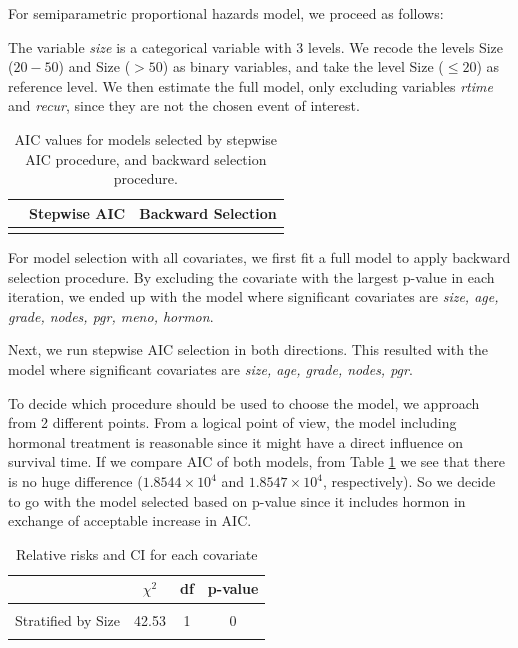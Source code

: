 \documentclass[
]{article}
\begin{document}
For semiparametric proportional hazards model, we proceed as follows:

The variable \textit{size} is a categorical variable with 3 levels. We recode the levels Size (\(20-50\)) and Size (\(>50\)) as binary variables, and take the level Size (\(\leq20\)) as reference level.
We then estimate the full model, only excluding variables \textit{rtime} and \textit{recur}, since they are not the chosen event of interest.

\begin{table}[!h]

\caption{\label{tab:AIC-table}AIC values for models selected by stepwise AIC procedure, and backward selection procedure. }
\centering
\fontsize{10}{12}\selectfont
\begin{tabular}[t]{lrr}
\toprule
  & Stepwise AIC & Backward Selection\\
\midrule
\cellcolor{gray!6}{AIC} & \cellcolor{gray!6}{18543.63} & \cellcolor{gray!6}{18546.82}\\
\bottomrule
\end{tabular}
\end{table}

For model selection with all covariates, we first fit a full model to apply backward selection procedure. By excluding the covariate with the largest p-value in each iteration, we ended up with the model where significant covariates are \textit{size, age, grade, nodes, pgr, meno, hormon}.

Next, we run stepwise AIC selection in both directions. This resulted with the model where significant covariates are \textit{size, age, grade, nodes, pgr}.

To decide which procedure should be used to choose the model, we approach from 2 different points. From a logical point of view, the model including hormonal treatment is reasonable since it might have a direct influence on survival time. If we compare AIC of both models, from Table \ref{tab:AIC-table} we see that there is no huge difference (\ensuremath{1.8544\times 10^{4}} and \ensuremath{1.8547\times 10^{4}}, respectively). So we decide to go with the model selected based on p-value since it includes hormon in exchange of acceptable increase in AIC.

\begin{table}[!h]

\caption{\label{tab:relative-risks-tbl}Relative risks and CI for each covariate}
\centering
\fontsize{10}{12}\selectfont
\begin{tabular}[t]{lccc}
\toprule
  & $\chi^2$ & df & p-value\\
\midrule
\cellcolor{gray!6}{Stratified by Chemo} & \cellcolor{gray!6}{69.59} & \cellcolor{gray!6}{1} & \cellcolor{gray!6}{0}\\
Stratified by Size & 42.53 & 1 & 0\\
\cellcolor{gray!6}{Stratified by Hormon} & \cellcolor{gray!6}{44.06} & \cellcolor{gray!6}{1} & \cellcolor{gray!6}{0}\\
\bottomrule
\end{tabular}
\end{table}
\end{document}
